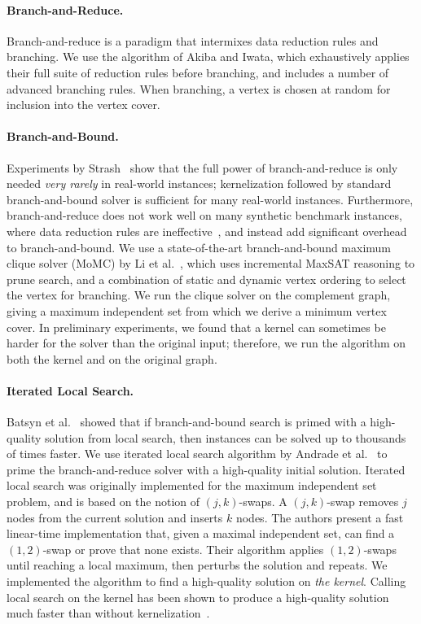 \documentclass[twoside,leqno,twocolumn]{article}
\begin{document}

\paragraph*{Branch-and-Reduce.}
Branch-and-reduce is a paradigm that intermixes data reduction rules and branching. We use the algorithm of Akiba and Iwata, which exhaustively applies their full suite of reduction rules before branching, and includes a number of advanced branching rules. When branching, a vertex is chosen at random for inclusion into the vertex cover.

\paragraph*{Branch-and-Bound.} Experiments by Strash~\cite{strash2016power} show that the full power of branch-and-reduce is only needed \emph{very rarely} in real-world instances; kernelization followed by standard branch-and-bound solver is sufficient for many real-world instances. Furthermore, branch-and-reduce does not work well on many synthetic benchmark instances, where data reduction rules are ineffective~\cite{akiba-tcs-2016}, and instead add significant overhead to branch-and-bound. We use a state-of-the-art branch-and-bound maximum clique solver (MoMC) by Li et al.~\cite{DBLP:journals/cor/LiJM17}, which uses incremental MaxSAT reasoning to prune search, and a combination of static and dynamic vertex ordering to select the vertex for branching. We run the clique solver on the complement graph, giving a maximum independent set from which we derive a minimum vertex cover. In preliminary experiments, we found that a kernel can sometimes be harder for the solver than the original input; therefore, we run the algorithm on both the kernel and on the original graph.

\paragraph*{Iterated Local Search.}
Batsyn et al.~\cite{batsyn-mcs-ils-2014} showed that if branch-and-bound search is primed with a high-quality solution from local search, then instances can be solved up to thousands of times faster. 
We use iterated local search algorithm by Andrade et al.~\cite{andrade-2012} to prime the branch-and-reduce solver with a high-quality initial solution. Iterated local search was originally implemented for the maximum independent set problem, and is based on the notion of $(j,k)$-swaps. A $(j,k)$-swap removes $j$ nodes from the current solution and inserts $k$ nodes. The authors present a fast linear-time implementation that, given a maximal independent set, can find a $(1,2)$-swap or prove that none exists. Their algorithm applies $(1,2)$-swaps until reaching a local maximum, then perturbs the solution and repeats. We implemented the algorithm to find a high-quality solution on \emph{the kernel}. Calling local search on the kernel has been shown to produce a high-quality solution much faster than without kernelization~\cite{chang2017computing,dahlum2016accelerating}.
\end{document}
